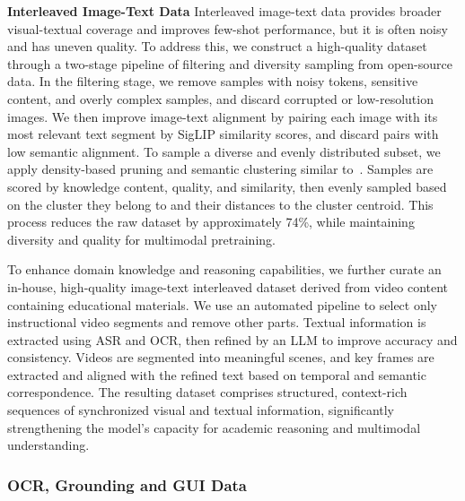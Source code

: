 \documentclass{article}
\begin{document}
\textbf{Interleaved Image-Text Data}
Interleaved image-text data provides broader visual-textual coverage and improves few-shot performance, but it is often noisy and has uneven quality. To address this, we construct a high-quality dataset through a two-stage pipeline of filtering and diversity sampling from open-source data. In the filtering stage, we remove samples with noisy tokens, sensitive content, and overly complex samples, and discard corrupted or low-resolution images. We then improve image-text alignment by pairing each image with its most relevant text segment by SigLIP similarity scores, and discard pairs with low semantic alignment.
To sample a diverse and evenly distributed subset, we apply density-based pruning and semantic clustering similar to~\citep{abbas2024effective}. Samples are scored by knowledge content, quality, and similarity, then evenly sampled based on the cluster they belong to and their distances to the cluster centroid. 
This process reduces the raw dataset by approximately 74\%, while maintaining diversity and quality for multimodal pretraining.

To enhance domain knowledge and reasoning capabilities, we further curate an in-house, high-quality image-text interleaved dataset derived from video content containing educational materials.
We use an automated pipeline to select only instructional video segments and remove other parts.
Textual information is extracted using ASR and OCR, then refined by an LLM to improve accuracy and consistency. Videos are segmented into meaningful scenes, and key frames are extracted and aligned with the refined text based on temporal and semantic correspondence. The resulting dataset comprises structured, context-rich sequences of synchronized visual and textual information, significantly strengthening the model’s capacity for academic reasoning and multimodal understanding.


\subsubsection{OCR, Grounding and GUI Data} \label{sec:pretrain_ocr_grounding_and_gui_data}
\end{document}
